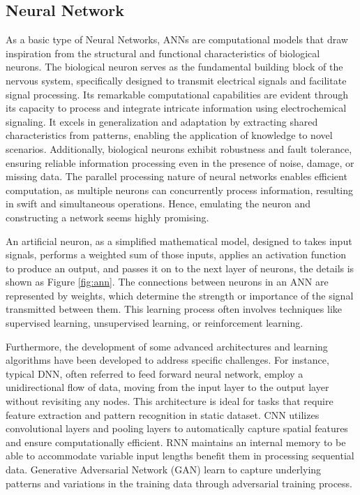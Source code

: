 \subsection{Neural Network}
As a basic type of Neural Networks, \ac{ANN}s are computational models that draw inspiration from the structural and functional characteristics of biological neurons\cite{zhangIntroductionArtificialNeural2000}. The biological neuron serves as the fundamental building block of the nervous system, specifically designed to transmit electrical signals and facilitate signal processing. Its remarkable computational capabilities are evident through its capacity to process and integrate intricate information using electrochemical signaling\cite{zouOverviewArtificialNeural2009}. It excels in generalization and adaptation by extracting shared characteristics from patterns, enabling the application of knowledge to novel scenarios. Additionally, biological neurons exhibit robustness and fault tolerance\cite{chenElectrochemicalMemristorBasedArtificialNeurons}, ensuring reliable information processing even in the presence of noise, damage, or missing data. The parallel processing nature of neural networks enables efficient computation\cite{hopfieldNeuralNetworksPhysical1982}, as multiple neurons can concurrently process information, resulting in swift and simultaneous operations. Hence, emulating the neuron and constructing a network seems highly promising. 

An artificial neuron, as a simplified mathematical model, designed to takes input signals, performs a weighted sum of those inputs, applies an activation function to produce an output, and passes it on to the next layer of neurons, the details is shown as Figure \ref{fig:ann}. The connections between neurons in an ANN are represented by weights, which determine the strength or importance of the signal transmitted between them. This learning process often involves techniques like supervised learning, unsupervised learning, or reinforcement learning. 

Furthermore, the development of some advanced architectures and learning algorithms have been developed to address specific challenges. For instance, typical \ac{DNN}, often referred to feed forward neural network, employ a unidirectional flow of data, moving from the input layer to the output layer without revisiting any nodes. This architecture is ideal for tasks that require feature extraction and pattern recognition in static dataset\cite{hwangboLearningAgileDynamic2019}. \ac{CNN} utilizes convolutional layers and pooling layers to automatically capture spatial features and ensure computationally efficient\cite{albawiUnderstandingConvolutionalNeural2017}. \ac{RNN} maintains an internal memory to be able to accommodate variable input lengths benefit them in processing sequential data\cite{liptonCriticalReviewRecurrent2015}. Generative Adversarial Network (GAN) learn to capture underlying patterns and variations in the training data through adversarial training process\cite{songEnergyConsumptionAuditing2023}.   

